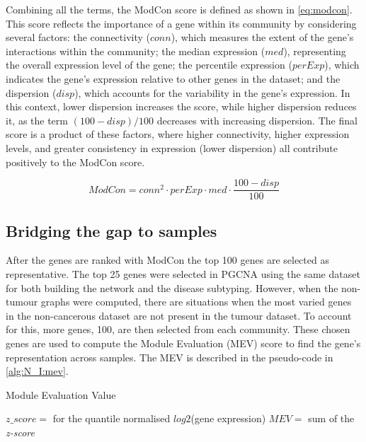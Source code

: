 Combining all the terms, the ModCon score is defined as shown in \cref{eq:modcon}. This score reflects the importance of a gene within its community by considering several factors: the connectivity ($conn$), which measures the extent of the gene's interactions within the community; the median expression ($med$), representing the overall expression level of the gene; the percentile expression ($perExp$), which indicates the gene's expression relative to other genes in the dataset; and the dispersion ($disp$), which accounts for the variability in the gene's expression. In this context, lower dispersion increases the score, while higher dispersion reduces it, as the term $(100 - disp)/100$ decreases with increasing dispersion. The final score is a product of these factors, where higher connectivity, higher expression levels, and greater consistency in expression (lower dispersion) all contribute positively to the ModCon score.

\begin{equation} \label{eq:modcon}
    ModCon = conn^2 \cdot perExp \cdot med \cdot \frac{100 - disp}{100}
\end{equation}

\subsection{Bridging the gap to samples} \label{s:N_I:mev}

After the genes are ranked with ModCon the top 100 genes are selected as representative. The top 25 genes were selected in PGCNA \citep{Care2019-ij} using the same dataset for both building the network and the disease subtyping. However, when the non-tumour graphs were computed, there are situations when the most varied genes in the non-cancerous dataset are not present in the tumour dataset. To account for this, more genes, 100, are then selected from each community. These chosen genes are used to compute the Module Evaluation (MEV) score \citep{Care2019-ij} to find the gene's representation across samples. The MEV is described in the pseudo-code in \cref{alg:N_I:mev}.

\begin{algorithm}
\caption{Module Evaluation Value }\label{alg:N_I:mev}
    \begin{algorithmic}
            \State $z\_score=$ for the quantile normalised $log2$(gene expression)
                \State $MEV=$ sum of the \textit{z-score}  
            \EndFor
        \EndFor
    \EndFor
    \end{algorithmic}
\end{algorithm}

